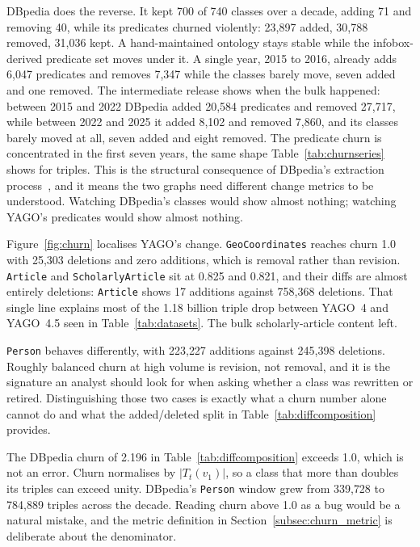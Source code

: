 DBpedia does the reverse. It kept 700 of 740 classes over a decade, adding 71 and
removing 40, while its predicates churned violently: 23{,}897 added, 30{,}788
removed, 31{,}036 kept. A hand-maintained ontology stays stable while the
infobox-derived predicate set moves under it. A single year, 2015 to 2016, already
adds 6{,}047 predicates and removes 7{,}347 while the classes barely move, seven
added and one removed. The intermediate release shows when the bulk happened: between 2015 and 2022 DBpedia added 20{,}584 predicates and
removed 27{,}717, while between 2022 and 2025 it added 8{,}102 and removed
7{,}860, and its classes barely moved at all, seven added and eight removed. The
predicate churn is concentrated in the first seven years, the same shape
Table~\ref{tab:churnseries} shows for triples. This is the structural consequence
of DBpedia's extraction process~\cite{bizer2009dbpedia}, and it means the two
graphs need different change metrics to be understood. Watching DBpedia's classes
would show almost nothing; watching YAGO's predicates would show almost nothing.

Figure~\ref{fig:churn} localises YAGO's change. \texttt{GeoCoordinates} reaches
churn 1.0 with 25{,}303 deletions and zero additions, which is removal rather
than revision. \texttt{Article} and \texttt{ScholarlyArticle} sit at 0.825 and
0.821, and their diffs are almost entirely deletions: \texttt{Article} shows 17
additions against 758{,}368 deletions. That single line explains most of the
1.18 billion triple drop between YAGO~4 and YAGO~4.5 seen in
Table~\ref{tab:datasets}. The bulk scholarly-article content left.

\texttt{Person} behaves differently, with 223{,}227 additions against 245{,}398
deletions. Roughly balanced churn at high volume is revision, not removal, and it
is the signature an analyst should look for when asking whether a class was
rewritten or retired. Distinguishing those two cases is exactly what a
churn number alone cannot do and what the added/deleted split in
Table~\ref{tab:diffcomposition} provides.

The DBpedia churn of 2.196 in Table~\ref{tab:diffcomposition} exceeds 1.0, which
is not an error. Churn normalises by $|T_t(v_1)|$, so a class that more than
doubles its triples can exceed unity. DBpedia's \texttt{Person} window grew from
339{,}728 to 784{,}889 triples across the decade. Reading churn above 1.0 as a
bug would be a natural mistake, and the metric definition in
Section~\ref{subsec:churn_metric} is deliberate about the denominator.

